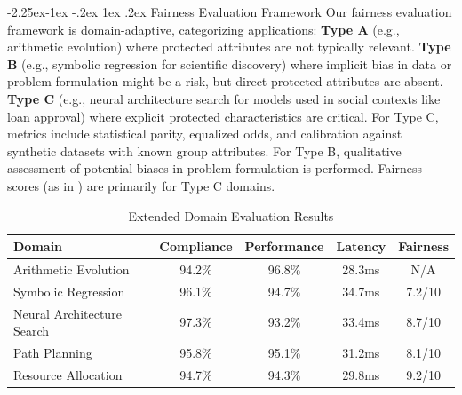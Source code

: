 \documentclass[manuscript,screen,review,anonymous,9pt]{acmart}
\makeatletter
\renewcommand\subsection{\@startsection{subsection}{2}{\z@}%
  {-2.25ex\@plus -1ex \@minus -.2ex}%
  {1ex \@plus .2ex}%
  {\normalfont\large\bfseries}}
\makeatother
\begin{document}
\subsection{Fairness Evaluation Framework}
Our fairness evaluation framework is domain-adaptive, categorizing applications: \textbf{Type A} (e.g., arithmetic evolution) where protected attributes are not typically relevant. \textbf{Type B} (e.g., symbolic regression for scientific discovery) where implicit bias in data or problem formulation might be a risk, but direct protected attributes are absent. \textbf{Type C} (e.g., neural architecture search for models used in social contexts like loan approval) where explicit protected characteristics are critical. For Type C, metrics include statistical parity, equalized odds, and calibration against synthetic datasets with known group attributes. For Type B, qualitative assessment of potential biases in problem formulation is performed. Fairness scores (as in ) are primarily for Type C domains.

\begin{table}[htbp]
\centering
\caption{Extended Domain Evaluation Results}
\label{tab:extended_domain_results}
\begin{tabular}{lcccc}
\hline
\textbf{Domain} & \textbf{Compliance} & \textbf{Performance} & \textbf{Latency} & \textbf{Fairness} \\
\hline
Arithmetic Evolution & 94.2\% & 96.8\% & 28.3ms & N/A \\
Symbolic Regression & 96.1\% & 94.7\% & 34.7ms & 7.2/10 \\
Neural Architecture Search & 97.3\% & 93.2\% & 33.4ms & 8.7/10 \\
Path Planning & 95.8\% & 95.1\% & 31.2ms & 8.1/10 \\
Resource Allocation & 94.7\% & 94.3\% & 29.8ms & 9.2/10 \\
\hline
\end{tabular}
\end{table}

\end{document}
